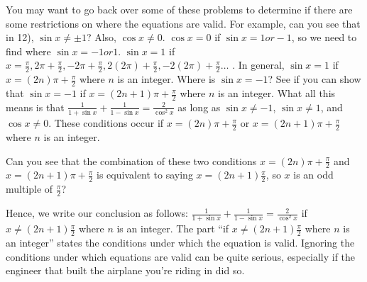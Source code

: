 \documentclass[english]{book}
\begin{document}
\begin{enumerate}
\begin{enumerate}
          \vspace{0.3cm}
          
          You may want to go back over some of these problems to determine if there are some restrictions on where the equations are valid. For example, can you see that in 12), $\sin x  \ne \pm 1$? Also, $\cos x \ne 0$. $\cos x = 0$ if $\sin x = 1 or -1$, so we need to find where $\sin x = -1 or 1$. $\sin x = 1$ if $x = \frac{\pi}{2}, 2\pi + \frac{\pi}{2}, -2\pi + \frac{\pi}{2}, 2(2\pi) + \frac{\pi}{2}, -2(2\pi) + \frac{\pi}{2} \dots$ . In general, $\sin x = 1$ if $x = (2n)\pi + \frac{\pi}{2}$ where $n$ is an integer. Where is $\sin x = -1$? See if you can show that $\sin x = -1$ if $x=(2n +1)\pi + \frac{\pi}{2}$ where $n$ is an integer. What all this means is that $\frac{1}{1 + \sin x} + \frac{1}{1 - \sin x} = \frac{2}{\cos^{2} x}$ as long as $\sin x \ne -1$, $\sin x \ne 1$, and $\cos x \ne 0$. These conditions occur if $x = (2n)\pi + \frac{\pi}{2}$ or $x = (2n+1)\pi + \frac{\pi}{2}$ where $n$ is an integer.

          \vspace{0.3cm}
          
          Can you see that the combination of these two conditions $x = (2n)\pi + \frac{\pi}{2}$ and $x = (2n + 1)\pi + \frac{\pi}{2}$ is equivalent to saying $x = (2n+1) \frac{\pi}{2}$, so $x$ is an odd multiple of $\frac{\pi}{2}$?

          \vspace{0.3cm}
          
          Hence, we write our conclusion as follows: $\frac{1}{1 + \sin x} + \frac{1}{1 - \sin x} = \frac{2}{\cos^{2} x}$ if $x \ne (2n+1) \frac{\pi}{2}$ where $n$ is an integer. The part ``if $x \ne (2n+1)\frac{\pi}{2}$ where $n$ is an integer'' states the conditions under which the equation is valid. Ignoring the conditions under which equations are valid can be quite serious, especially if the engineer that built the airplane you're riding in did so.
    \end{enumerate}



\end{enumerate}
\end{document}
